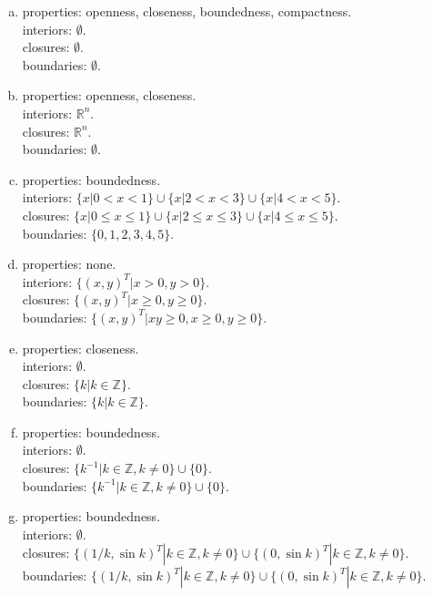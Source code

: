 \documentclass[
	12pt, %
]{fphw}
\begin{document}
\begin{enumerate}[a. ]
		\item properties: openness, closeness, boundedness, compactness.\\
			interiors: $\emptyset$.\\
			closures: $\emptyset$.\\
			boundaries: $\emptyset$.
		\item properties: openness, closeness.\\
			interiors: $\mathbb{R}^n$.\\
			closures: $\mathbb{R}^n$.\\
			boundaries: $\emptyset$.
		\item properties: boundedness.\\
			interiors: $\{x|0< x< 1\}\cup\{x|2< x <3\}\cup\{x|4< x <5\}$.\\
			closures: $\{x|0\leq x\leq 1\}\cup\{x|2\leq x \leq3\}\cup\{x|4\leq x \leq5\}$.\\
			boundaries: $\{0,1,2,3,4,5\}$.
		\item properties: none.\\
			interiors: $\{(x,y)^T|x> 0,y> 0\}$.\\
			closures: $\{(x,y)^T|x\geq 0,y\geq 0\}$.\\
			boundaries: $\{(x,y)^T|xy\geq 0,x\geq 0,y\geq 0\}$.
		\item properties: closeness.\\
			interiors: $\emptyset$.\\
			closures: $\{k|k\in \mathbb{Z}\}$.\\
			boundaries: $\{k|k\in \mathbb{Z}\}$.
		\item properties: boundedness.\\
			interiors: $\emptyset$.\\
			closures: $\{k^{-1}|k\in \mathbb{Z},k\neq 0\}\cup \{0\}$.\\
			boundaries: $\{k^{-1}|k\in \mathbb{Z},k\neq 0\}\cup \{0\}$.
		\item properties: boundedness.\\
			interiors: $\emptyset$.\\
			closures: $\{(1/k,\sin{k})^T|k\in \mathbb{Z},k\neq 0\}\cup \{(0,\sin{k})^T|k\in \mathbb{Z},k\neq 0\}$.\\
			boundaries: $\{(1/k,\sin{k})^T|k\in \mathbb{Z},k\neq 0\}\cup \{(0,\sin{k})^T|k\in \mathbb{Z},k\neq 0\}$.
	
	\end{enumerate}
\end{document}
